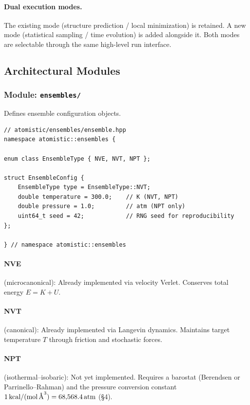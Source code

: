 \documentclass[11pt]{article}
\begin{document}
\paragraph{Dual execution modes.}
The existing mode (structure prediction / local minimization) is retained.
A new mode (statistical sampling / time evolution) is added alongside it.
Both modes are selectable through the same high-level run interface.

\subsection{Architectural Modules}

\subsubsection{Module: \texttt{ensembles/}}

Defines ensemble configuration objects.

\begin{lstlisting}
// atomistic/ensembles/ensemble.hpp
namespace atomistic::ensembles {

enum class EnsembleType { NVE, NVT, NPT };

struct EnsembleConfig {
    EnsembleType type = EnsembleType::NVT;
    double temperature = 300.0;    // K (NVT, NPT)
    double pressure = 1.0;         // atm (NPT only)
    uint64_t seed = 42;            // RNG seed for reproducibility
};

} // namespace atomistic::ensembles
\end{lstlisting}

\paragraph{NVE} (microcanonical): Already implemented via velocity Verlet.
Conserves total energy $E = K + U$.

\paragraph{NVT} (canonical): Already implemented via Langevin dynamics.
Maintains target temperature $T$ through friction and stochastic forces.

\paragraph{NPT} (isothermal--isobaric): Not yet implemented.  Requires
a barostat (Berendsen or Parrinello--Rahman) and the pressure conversion
constant $1\,\text{kcal/(mol\,\AA}^3) = 68{,}568.4\,\text{atm}$ (\S4).
\end{document}
